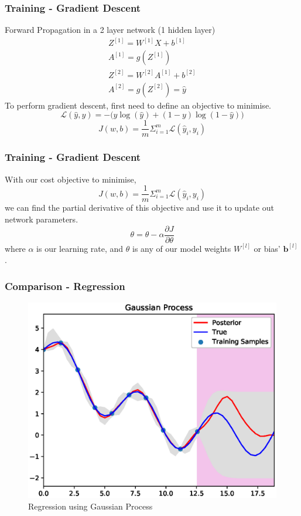 \documentclass{beamer}
\newcommand{\mb}[1]{\mathbf{#1}}
\begin{document}
% 
% 
% 
% 
\begin{frame}
  \frametitle{Training - Gradient Descent}
  Forward Propagation in a 2 layer network (1 hidden layer)
  \begin{gather*}
   Z^{[1]} = W^{[1]}X + b^{[1]}\\
    A^{[1]} = g(Z^{[1]})\\
    Z^{[2]} = W^{[2]}A^{[1]} + b^{[2]}\\
    A^{[2]} = g(Z^{[2]}) = \hat{y}
  \end{gather*}
  To perform gradient descent, first need to define an objective to minimise.
  \begin{equation*}
    \mathcal{L}(\hat{y}, y) = - \Big(y\log(\hat{y}) + (1-y)\log(1 - \hat{y})  \Big)
  \end{equation*}
  \begin{equation*}
    J(w,b) =\frac{1}{m} \Sigma_{i=1}^{m}\mathcal{L}(\hat{y}_i, y_i)
  \end{equation*}
\end{frame}
% 
% 
% 
% 
\begin{frame}
  \frametitle{Training - Gradient Descent}
  With our cost objective to minimise,
  \begin{equation*}
    J(w,b) =\frac{1}{m} \Sigma_{i=1}^{m}\mathcal{L}(\hat{y}_i, y_i)
  \end{equation*}
  we can find the partial derivative of this objective and use it to update out network parameters.
  \begin{equation*}
    \theta = \theta - \alpha \dfrac{\partial J}{\partial \theta}
  \end{equation*}
  where $\alpha$ is our learning rate, and $\theta$ is any of our model weights $W^{[l]}$ or bias' $\mb{b}^{[l]}$.
\end{frame}
% 
% 
% 
% 
\begin{frame}
  \frametitle{Comparison - Regression}
  \vspace*{-0.15cm}
  \begin{figure}[!h]
    \centering
    \includegraphics[width=0.8\linewidth]{./figs/gp.eps}
    \caption{Regression using Gaussian Process}
    \label{fig:gp}
  \end{figure}
\end{frame}
\end{document}
